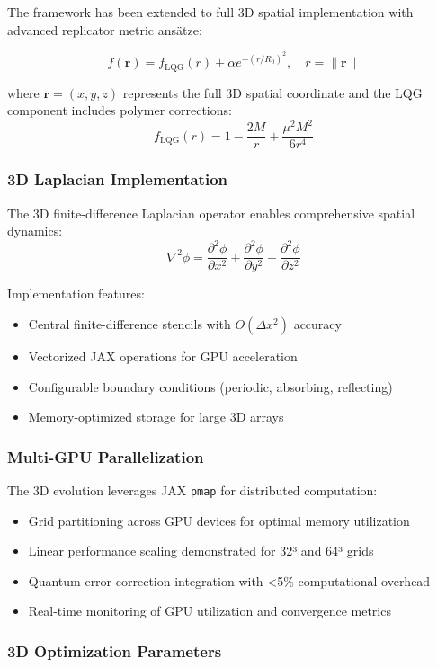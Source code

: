 \documentclass[11pt]{article}
\begin{document}
The framework has been extended to full 3D spatial implementation with advanced replicator metric ansätze:

\[
f(\mathbf{r}) = f_{\text{LQG}}(r) + \alpha e^{-(r/R_0)^2}, \quad r = \|\mathbf{r}\|
\]

where $\mathbf{r} = (x,y,z)$ represents the full 3D spatial coordinate and the LQG component includes polymer corrections:
\[
f_{\text{LQG}}(r) = 1 - \frac{2M}{r} + \frac{\mu^2 M^2}{6r^4}
\]

\subsubsection*{3D Laplacian Implementation}

The 3D finite-difference Laplacian operator enables comprehensive spatial dynamics:
\[
\nabla^2\phi = \frac{\partial^2\phi}{\partial x^2} + \frac{\partial^2\phi}{\partial y^2} + \frac{\partial^2\phi}{\partial z^2}
\]

Implementation features:
\begin{itemize}
\item Central finite-difference stencils with $O(\Delta x^2)$ accuracy
\item Vectorized JAX operations for GPU acceleration
\item Configurable boundary conditions (periodic, absorbing, reflecting)
\item Memory-optimized storage for large 3D arrays
\end{itemize}

\subsubsection*{Multi-GPU Parallelization}

The 3D evolution leverages JAX \texttt{pmap} for distributed computation:
\begin{itemize}
\item Grid partitioning across GPU devices for optimal memory utilization
\item Linear performance scaling demonstrated for 32³ and 64³ grids
\item Quantum error correction integration with <5\% computational overhead
\item Real-time monitoring of GPU utilization and convergence metrics
\end{itemize}

\subsubsection*{3D Optimization Parameters}
\end{document}
